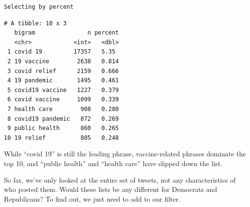 \documentclass[
  letterpaper,
  DIV=11,
  numbers=noendperiod]{scrreprt}
\newenvironment{Shaded}{\begin{snugshade}}{\end{snugshade}}
\newcommand{\AttributeTok}[1]{\textcolor[rgb]{0.40,0.45,0.13}{#1}}
\newcommand{\ConstantTok}[1]{\textcolor[rgb]{0.56,0.35,0.01}{#1}}
\newcommand{\DecValTok}[1]{\textcolor[rgb]{0.68,0.00,0.00}{#1}}
\newcommand{\FunctionTok}[1]{\textcolor[rgb]{0.28,0.35,0.67}{#1}}
\newcommand{\NormalTok}[1]{\textcolor[rgb]{0.00,0.23,0.31}{#1}}
\newcommand{\SpecialCharTok}[1]{\textcolor[rgb]{0.37,0.37,0.37}{#1}}
\newcommand{\StringTok}[1]{\textcolor[rgb]{0.13,0.47,0.30}{#1}}
\begin{document}
\begin{verbatim}
Selecting by percent
\end{verbatim}

\begin{verbatim}
# A tibble: 10 x 3
   bigram               n percent
   <chr>            <int>   <dbl>
 1 covid 19         17357   5.35 
 2 19 vaccine        2638   0.814
 3 covid relief      2159   0.666
 4 19 pandemic       1495   0.461
 5 covid19 vaccine   1227   0.379
 6 covid vaccine     1099   0.339
 7 health care        908   0.280
 8 covid19 pandemic   872   0.269
 9 public health      860   0.265
10 19 relief          805   0.248
\end{verbatim}

While ``covid 19'' is still the leading phrase, vaccine-related phrases
dominate the top 10, and ``public health'' and ``health care'' have
slipped down the list.

So far, we've only looked at the entire set of tweets, not any
characteristics of who posted them. Would these lists be any different
for Democrats and Republicans? To find out, we just need to add to our
filter.

\begin{Shaded}
\end{Shaded}
\end{document}
